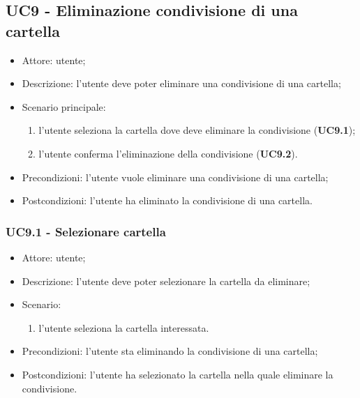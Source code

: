     \subsection{UC9 - Eliminazione condivisione di una cartella}
    \begin{itemize}
        \item Attore: utente;
        \item Descrizione: l'utente deve poter eliminare una condivisione di una cartella;
        \item Scenario principale:
            \begin{enumerate}
            \item l'utente seleziona la cartella dove deve eliminare la condivisione (\textbf{UC9.1});
            \item l'utente conferma l'eliminazione della condivisione (\textbf{UC9.2}).
            \end{enumerate}
        \item Precondizioni: l'utente vuole eliminare una condivisione di una cartella;
        \item Postcondizioni: l'utente ha eliminato la condivisione di una cartella.
    \end{itemize}
    \subsubsection{UC9.1 - Selezionare cartella}
    \begin{itemize}
        \item Attore: utente;
        \item Descrizione: l'utente deve poter selezionare la cartella da eliminare;
        \item Scenario:
        \begin{enumerate}
        \item l'utente seleziona la cartella interessata.
        \end{enumerate}
        \item Precondizioni: l'utente sta eliminando la condivisione di una cartella;
        \item Postcondizioni: l'utente ha selezionato la cartella nella quale eliminare la condivisione.
    \end{itemize}


